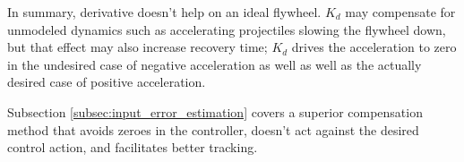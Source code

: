 In summary, derivative doesn't help on an ideal flywheel. $K_d$ may compensate
for unmodeled dynamics such as accelerating projectiles slowing the flywheel
down, but that effect may also increase recovery time; $K_d$ drives the
acceleration to zero in the undesired case of negative acceleration as well as
well as the actually desired case of positive acceleration.

Subsection \ref{subsec:input_error_estimation} covers a superior compensation
method that avoids zeroes in the \gls{controller}, doesn't act against the
desired control action, and facilitates better \gls{tracking}.
